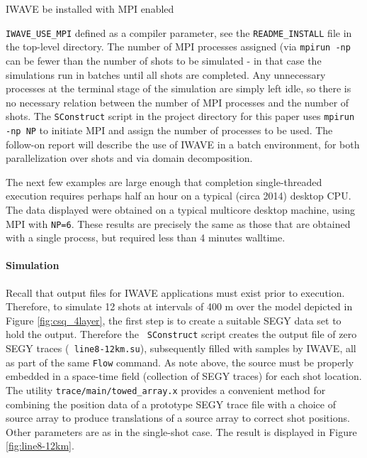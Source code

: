 IWAVE be installed with MPI enabled {{\tt IWAVE\_USE\_MPI} defined as a
compiler parameter, see the {\tt README\_INSTALL} file in the top-level
directory. The number of MPI processes assigned (via {\tt mpirun -np}
can be fewer than the number of shots to be simulated - in that case
the simulations run in batches until all shots are completed. Any
unnecessary processes at the terminal stage of the simulation are simply left
idle, so there is no necessary relation between the number of MPI
processes and the number of shots. The {\tt SConstruct} script in the
project directory for this paper uses {\tt mpirun -np NP} to initiate
MPI and assign the number of processes to be used. The follow-on
report will describe the use of IWAVE in a batch environment, for both
parallelization over shots and via domain decomposition.

The next few examples are large enough that completion single-threaded
execution requires perhaps half an hour on a typical (circa 2014) desktop
CPU.  The data displayed were obtained on a typical multicore desktop
machine, using MPI with {\tt NP=6}. These results are precisely the
same as those that are obtained with a single process, but required
less than 4 minutes walltime.

\noindent \paragraph{Simulation}
Recall that output files for IWAVE applications must exist prior to
execution. Therefore, to simulate 12 shots at intervals of 400 m over
the model depicted in Figure \ref{fig:csq_4layer}, the first step is
to create a suitable SEGY data set to hold the output. Therefore the {\tt
  SConstruct} script creates the output file of zero SEGY traces ({\tt
  line8-12km.su}), subsequently filled with samples by IWAVE, all as
part of the same {\tt Flow} command. As note above, the source must
be properly embedded in a space-time field (collection of SEGY traces)
for each shot location. The utility {\tt trace/main/towed\_array.x}
provides a convenient method for combining the position data of a
prototype SEGY trace file with a choice of source array to produce
translations of a source array to correct shot positions. Other
parameters are as in the single-shot case. The result is displayed in
Figure \ref{fig:line8-12km}.


}
